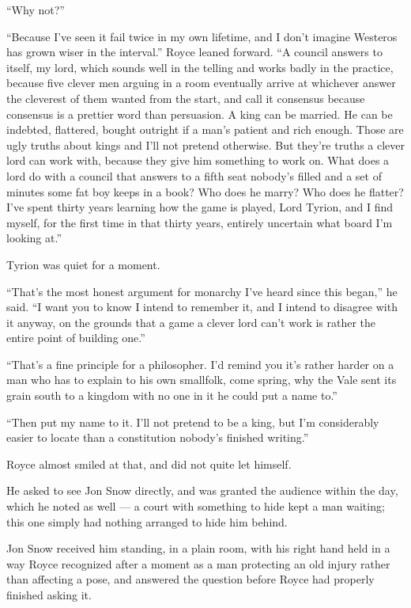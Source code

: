 “Why not?”

“Because I’ve seen it fail twice in my own lifetime, and I don’t imagine Westeros has grown wiser in the interval.” Royce leaned forward. “A council answers to itself, my lord, which sounds well in the telling and works badly in the practice, because five clever men arguing in a room eventually arrive at whichever answer the cleverest of them wanted from the start, and call it consensus because consensus is a prettier word than persuasion. A king can be married. He can be indebted, flattered, bought outright if a man’s patient and rich enough. Those are ugly truths about kings and I’ll not pretend otherwise. But they’re truths a clever lord can work with, because they give him something to work on. What does a lord do with a council that answers to a fifth seat nobody’s filled and a set of minutes some fat boy keeps in a book? Who does he marry? Who does he flatter? I’ve spent thirty years learning how the game is played, Lord Tyrion, and I find myself, for the first time in that thirty years, entirely uncertain what board I’m looking at.”

Tyrion was quiet for a moment.

“That’s the most honest argument for monarchy I’ve heard since this began,” he said. “I want you to know I intend to remember it, and I intend to disagree with it anyway, on the grounds that a game a clever lord can’t work is rather the entire point of building one.”

“That’s a fine principle for a philosopher. I’d remind you it’s rather harder on a man who has to explain to his own smallfolk, come spring, why the Vale sent its grain south to a kingdom with no one in it he could put a name to.”

“Then put my name to it. I’ll not pretend to be a king, but I’m considerably easier to locate than a constitution nobody’s finished writing.”

Royce almost smiled at that, and did not quite let himself.

\sceneBreak

He asked to see Jon Snow directly, and was granted the audience within the day, which he noted as well — a court with something to hide kept a man waiting; this one simply had nothing arranged to hide him behind.

Jon Snow received him standing, in a plain room, with his right hand held in a way Royce recognized after a moment as a man protecting an old injury rather than affecting a pose, and answered the question before Royce had properly finished asking it.


